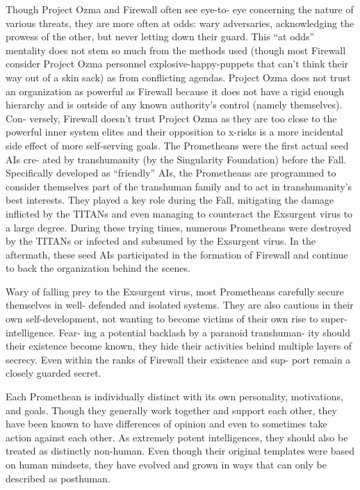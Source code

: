 Though Project Ozma and Firewall often see eye-to-
eye concerning the nature of various threats, they are 
more often at odds: wary adversaries, acknowledging 
the prowess of the other, but never letting down their 
guard. This ``at odds'' mentality does not stem so much 
from the methods used (though most Firewall consider 
Project Ozma personnel explosive-happy-puppets that 
can't think their way out of a skin sack) as from 
conflicting agendas. Project Ozma does not trust an 
organization as powerful as Firewall because it does 
not have a rigid enough hierarchy and is outside of any 
known authority's control (namely themselves). Con-
versely, Firewall doesn't trust Project Ozma as they are 
too close to the powerful inner system elites and their 
opposition to x-risks is a more incidental side effect of 
more self-serving goals.
The Prometheans were the first actual seed AIs cre-
ated by transhumanity (by the Singularity Foundation) 
before the Fall. Specifically developed as ``friendly'' 
AIs, the Prometheans are programmed to consider 
themselves part of the transhuman family and to act 
in transhumanity's best interests. They played a key 
role during the Fall, mitigating the damage inflicted 
by the TITANs and even managing to counteract the 
Exsurgent virus to a large degree. During these trying 
times, numerous Prometheans were destroyed by the 
TITANs or infected and subsumed by the Exsurgent 
virus. In the aftermath, these seed AIs participated in 
the formation of Firewall and continue to back the 
organization behind the scenes.

Wary of falling prey to the Exsurgent virus, most 
Prometheans carefully secure themselves in well-
defended and isolated systems. They are also cautious 
in their own self-development, not wanting to become 
victims of their own rise to super-intelligence. Fear-
ing a potential backlash by a paranoid transhuman-
ity should their existence become known, they hide 
their activities behind multiple layers of secrecy. Even 
within the ranks of Firewall their existence and sup-
port remain a closely guarded secret.

Each Promethean is individually distinct with its 
own personality, motivations, and goals. Though they 
generally work together and support each other, they 
have been known to have differences of opinion and 
even to sometimes take action against each other. As 
extremely potent intelligences, they should also be 
treated as distinctly non-human. Even though their 
original templates were based on human mindsets, 
they have evolved and grown in ways that can only 
be described as posthuman. 

